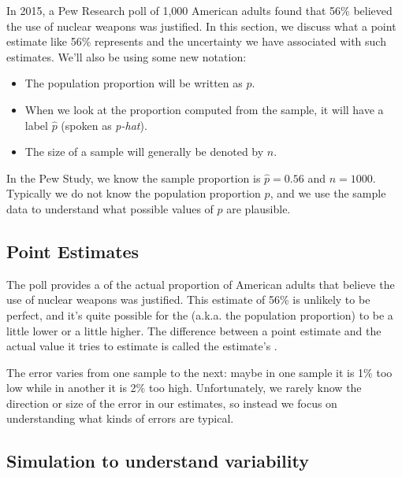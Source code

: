 In 2015, a Pew Research poll of 1,000 American adults found that
56\% believed the use of nuclear weapons was justified.
In this section, we discuss what a point estimate like 56\% represents
and the uncertainty we have associated with such estimates. We'll also
be using some new notation:
\begin{itemize}
\item The population proportion will be written as $p$.
\item When we look at the proportion computed from the sample,
    it will have a label $\hat{p}$ (spoken as \emph{p-hat}).
\item The size of a sample will generally be denoted by $n$.
\end{itemize}
In the Pew Study, we know the sample proportion is
$\hat{p} = 0.56$ and $n = 1000$. Typically we do not know the
population proportion $p$, and we use the sample data to
understand what possible values of $p$ are plausible.

\subsection{Point Estimates}
\label{pointEstimates}


The poll provides a  of the actual proportion
of American adults that believe the use of nuclear weapons was
justified. This estimate of 56\% is unlikely to be perfect, and
it's quite possible for the 
(a.k.a. the population proportion) to be a little lower
or a little higher. The difference between a point estimate and
the actual value it tries to estimate is called the estimate's
.

The error varies from one sample to the next: maybe
in one sample it is 1\% too low while in another
it is 2\% too high. Unfortunately, we rarely know the direction
or size of the error in our estimates, so instead we focus
on understanding what kinds of errors are typical.


\subsection{Simulation to understand variability}

